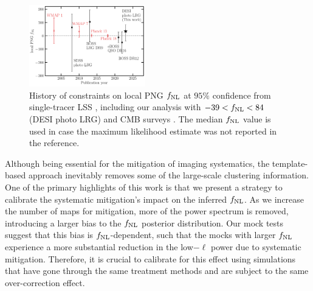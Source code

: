 \begin{figure}
    \centering
    \includegraphics[width=0.45\textwidth]{figures/fnl_history.pdf}
    \caption{History of constraints on local PNG $f_{\rm NL}$ at $95\%$ confidence from single-tracer LSS \citep{slosar2008constraints,2013MNRAS.428.1116R, mueller2022primordial, 2022PhRvD.106d3506C}, including our analysis with $-39<f_{\rm NL}<84$ (DESI photo LRG) and CMB surveys \citep{Komatsu_2003, Komatsu_2010, planck13, akrami2019planck}. The median $f_{\rm NL}$ value is used in case the maximum likelihood estimate was not reported in the reference.}
    \label{fig:fnlhist}
\end{figure}

Although being essential for the mitigation of imaging systematics, the template-based approach inevitably removes some of the large-scale clustering information. One of the primary highlights of this work is that we present a strategy to calibrate the systematic mitigation's impact on the inferred $f_{\rm NL}$. As we increase the number of maps for mitigation, more of the power spectrum is removed, introducing a larger bias to the $f_{\rm NL}$ posterior distribution. Our mock tests suggest that this bias is $f_{\rm NL}$-dependent, such that the mocks with larger $f_{\rm NL}$ experience a more substantial reduction in the low$-\ell$ power due to systematic mitigation. Therefore, it is crucial to calibrate for this effect using simulations that have gone through the same treatment methods and are subject to the same over-correction effect.

